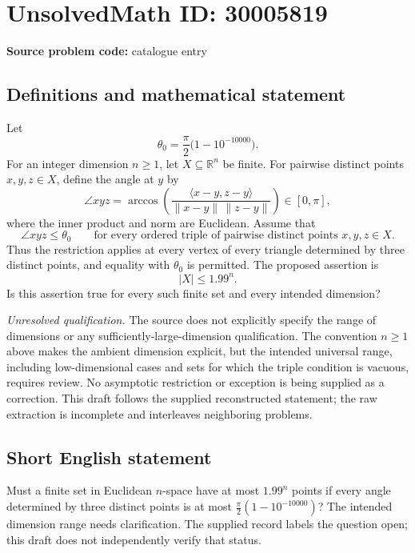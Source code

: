 \documentclass[11pt]{article}
\newcommand{\R}{\mathbb{R}}
\begin{document}
\section*{UnsolvedMath ID: 30005819}
\textbf{Source problem code:} catalogue entry
\subsection{Definitions and mathematical statement}
Let
\[
\theta_0=\frac{\pi}{2}\bigl(1-10^{-10000}\bigr).
\]
For an integer dimension \(n\geq 1\), let \(X\subseteq\R^n\) be finite. For pairwise distinct points \(x,y,z\in X\), define the angle at \(y\) by
\[
\angle xyz=\arccos\!\left(\frac{\langle x-y,z-y\rangle}{\|x-y\|\,\|z-y\|}\right)\in[0,\pi],
\]
where the inner product and norm are Euclidean. Assume that
\[
\angle xyz\leq\theta_0
\qquad\text{for every ordered triple of pairwise distinct points }x,y,z\in X.
\]
Thus the restriction applies at every vertex of every triangle determined by three distinct points, and equality with \(\theta_0\) is permitted. The proposed assertion is
\[
|X|\leq 1.99^n.
\]
Is this assertion true for every such finite set and every intended dimension?

\emph{Unresolved qualification.} The source does not explicitly specify the range of dimensions or any sufficiently-large-dimension qualification. The convention \(n\geq1\) above makes the ambient dimension explicit, but the intended universal range, including low-dimensional cases and sets for which the triple condition is vacuous, requires review. No asymptotic restriction or exception is being supplied as a correction. This draft follows the supplied reconstructed statement; the raw extraction is incomplete and interleaves neighboring problems.
\subsection{Short English statement}
Must a finite set in Euclidean \(n\)-space have at most \(1.99^n\) points if every angle determined by three distinct points is at most \(\frac{\pi}{2}(1-10^{-10000})\)? The intended dimension range needs clarification. The supplied record labels the question open; this draft does not independently verify that status.
\end{document}
